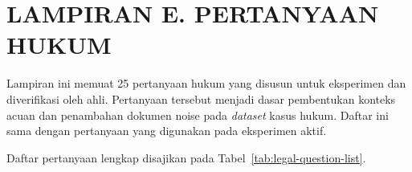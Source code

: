 \clearpage
\chapter*{LAMPIRAN E. PERTANYAAN HUKUM}

Lampiran ini memuat 25 pertanyaan hukum yang disusun untuk eksperimen dan diverifikasi oleh ahli.
Pertanyaan tersebut menjadi dasar pembentukan konteks acuan dan penambahan dokumen
noise pada \emph{dataset} kasus hukum. Daftar ini sama dengan pertanyaan yang digunakan
pada eksperimen aktif.

\noindent Daftar pertanyaan lengkap disajikan pada Tabel~\ref{tab:legal-question-list}.

\begingroup
\small
\setlength{\LTpre}{0pt}
\setlength{\LTpost}{0pt}
\renewcommand{\arraystretch}{1.12}
